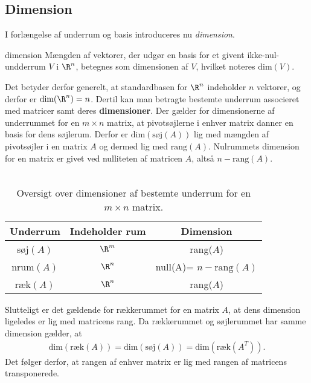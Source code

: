 \subsection{Dimension}
I forlængelse af underrum og basis introduceres nu
\textit{dimension}. 
%
\begin{defn}{}{dimension}
Mængden af vektorer, der udgør en basis for et givent ikke-nul-undderrum $V$ i $\R^n$, betegnes som dimensionen af $V$, hvilket noteres $\text{dim}(V)$. 
\end{defn}
\noindent
Det betyder derfor generelt, at standardbasen for $\R^n$ indeholder $n$ vektorer, og derfor er $\text{dim}(\R^n) = n$. 
Dertil kan man betragte bestemte underrum associeret med matricer samt deres \textbf{dimensioner}. 
Der gælder for dimensionerne af underrummet for en $m \times n$ matrix, at pivotsøjlerne i enhver matrix danner en basis for dens søjlerum. 
Derfor er $\text{dim}(\text{søj}(A))$ lig med mængden af pivotsøjler i en matrix $A$ og dermed lig med $\text{rang}(A)$. 
Nulrummets dimension for en matrix er givet ved nulliteten af matricen $A$, altså $n-\text{rang}(A)$. 
\\\\
%
\begin{table}[h!]
\begin{center}
 \begin{tabular}{||c c c||} 
 \hline
 Underrum & Indeholder rum & Dimension\\
 \hline\hline
 søj$(A)$ & $\R^m$ & rang($A$)\\ 
 \hline
 nrum$(A)$ & $\R^n$ & null(A)= $n-\text{rang}(A)$\\
 \hline
 ræk$(A)$ & $\R^n$ & rang($A$)\\
 \hline
\end{tabular}
\caption{Oversigt over dimensioner af bestemte underrum for en $m \times n$ matrix.}
\end{center}
\end{table}
%


%
\noindent
Slutteligt er det gældende for rækkerummet for en matrix $A$, at dens dimension ligeledes er lig med matricens rang. 
Da rækkerummet og søjlerummet har samme dimension gælder, at
%
\begin{align*}
\text{dim}(\text{ræk}(A))=\text{dim}(\text{søj}(A))=\text{dim}(\text{ræk}(A^T)).
\end{align*}
%
Det følger derfor, at rangen af enhver matrix er lig med rangen af matricens transponerede. 
%